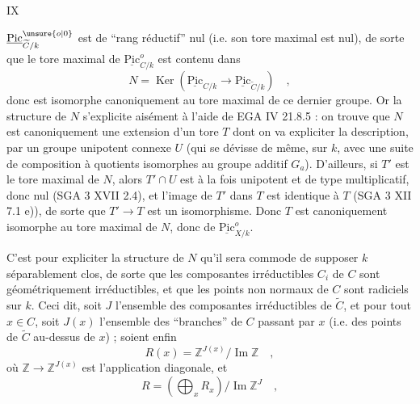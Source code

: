 \hfill IX

$\underline{\mathrm{Pic}}^{\unsure{o|0}}_{\widetilde C/k}$ est de ``rang réductif'' nul (i.e. son tore maximal est nul), de sorte que le tore maximal de $\underline{\mathrm{Pic}}^o_{C/k}$ est contenu dans
\[
 N=\operatorname{Ker}(\underline{\mathrm{Pic}}_{C/k}\longrightarrow\underline{\mathrm{Pic}}_{\widetilde C/k})\quad ,
\]
donc est isomorphe canoniquement au tore maximal de ce dernier groupe.
Or la structure de $N$ s'explicite aisément à l'aide de EGA IV 21.8.5 : on trouve que $N$ est canoniquement une extension d'un tore $T$ dont on va expliciter la description, par un groupe unipotent connexe $U$ (qui se dévisse de même, sur $k$, avec une suite de composition à quotients isomorphes au groupe additif $G_a$). D'ailleurs, si $T'$ est le tore maximal de $N$, alors $T'\cap U$ est à la fois unipotent et de type multiplicatif, donc nul (SGA 3 XVII 2.4), et l'image de $T'$ dans $T$ est identique à $T$ (SGA 3 XII 7.1 e)), de sorte que $T'\longrightarrow T$ est un isomorphisme. Donc $T$ est canoniquement isomorphe au tore maximal de $N$, donc de $\underline{\mathrm{Pic}}^o_{X/k}$.

C'est pour expliciter la structure de $N$ qu'il sera commode de supposer $k$ séparablement clos, de sorte que les composantes irréductibles $C_i$ de $C$ sont géométriquement irréductibles, et que les points non normaux de $C$ sont radiciels sur $k$. Ceci dit, soit $J$ l'ensemble des composantes irréductibles de $\widetilde C$, et pour tout $x\in C$, soit $J(x)$ l'ensemble des ``branches'' de $C$ passant par $x$ (i.e. des points de $\widetilde C$ au-dessus de $x$) ; soient enfin
\[
 R(x)=\mathbb{Z}^{J(x)}/\operatorname{Im}\mathbb{Z}\quad ,\tag*{(12.3.1)}
\]
où $\mathbb{Z}\longrightarrow\mathbb{Z}^{J(x)}$ est l'application diagonale, et
\[
 R=(\bigoplus_x R_x)/\operatorname{Im}\mathbb{Z}^J\quad ,\tag*{(12.3.2)}
\]

